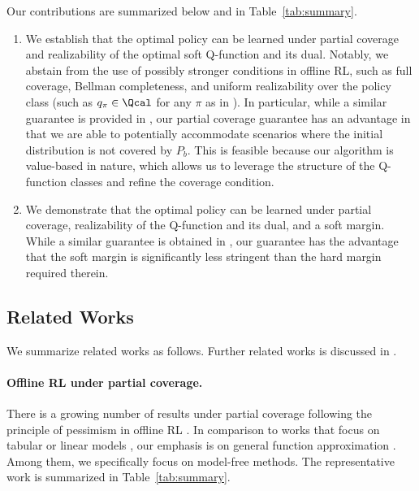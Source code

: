 Our contributions are summarized below and in Table~\ref{tab:summary}. 


\begin{enumerate} 
    \item We establish that the optimal policy can be learned under partial coverage and realizability of the optimal soft Q-function and its dual. Notably, we abstain from the use of possibly stronger conditions in offline RL, such as full coverage, Bellman completeness, and uniform realizability over the policy class (such as $q_{\pi}\in \Qcal$ for any $\pi$ as in \citealp{jiang2020minimax}). In particular, while a similar guarantee is provided in \citet{zhan2022offline}, our partial coverage guarantee has an advantage in that we are able to potentially accommodate scenarios where the initial distribution is not covered by $P_b$. This is feasible because our algorithm is value-based in nature, which allows us to leverage the structure of the Q-function classes and refine the coverage condition.  

    \item  We demonstrate that the optimal policy can be learned under partial coverage, realizability of the Q-function and its dual, and a soft margin. %
    While a similar guarantee is obtained in \citet{chen2022offline}, our guarantee has the advantage that the soft margin is significantly less stringent than the hard margin required therein.  
\end{enumerate}



\subsection{Related Works} \label{subsec:related}


We summarize related works as follows. Further related works is discussed in . 


\paragraph{Offline RL under partial coverage.}

There is a growing number of results under partial coverage following the principle of pessimism in offline RL \citep{Yu2020,Kidambi2020}. In comparison to works that focus on tabular \citep{RashidinejadParia2021BORL,li2022pessimism,shi2022pessimistic,yin2021towards} or linear models \citep{JinYing2020IPPE,chang2021mitigating,zhang2022corruption,nguyen2022instance,bai2022pessimistic}, our emphasis is on general function approximation \citep{jiang2020minimax,uehara2021pessimistic,xie2021bellman,zhan2022offline,zhu2023importance,rashidinejad2022optimal,zanette2022bellman,ozdaglar2023revisiting}. Among them, we specifically focus on model-free methods. The representative work is summarized in Table~\ref{tab:summary}.

